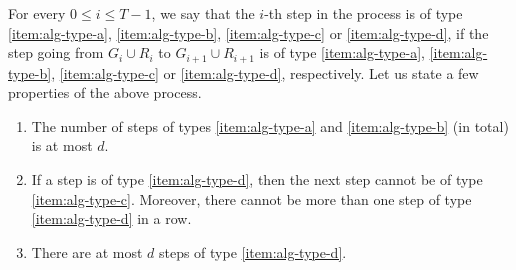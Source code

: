 \documentclass[11pt,a4paper,oneside,reqno]{amsart}
\newcommand{\1}{\mathbbm{1}} %
\renewcommand{\le}{\leqslant}
\begin{document}
For every $0 \le i \le T - 1$, we say that the $i$-th step in the process is of type \ref{item:alg-type-a}, \ref{item:alg-type-b}, \ref{item:alg-type-c} or \ref{item:alg-type-d}, if the step going from $G_i \cup R_i$ to $G_{i+1} \cup R_{i+1}$ is of type \ref{item:alg-type-a}, \ref{item:alg-type-b}, \ref{item:alg-type-c} or \ref{item:alg-type-d}, respectively. 
Let us state a few properties of the above process.

\begin{claim}\label{claim:alg-properties} 
    \begin{enumerate}
        \item The number of steps of types \ref{item:alg-type-a} and \ref{item:alg-type-b} (in total) is at most $d$.
        
        \item If a step is of type \ref{item:alg-type-d}, then the next step cannot be of type \ref{item:alg-type-c}. Moreover, there cannot be more than one step of type \ref{item:alg-type-d} in a row.
        
        \item There are at most $d$ steps of type \ref{item:alg-type-d}.
    \end{enumerate}
\end{claim}
\end{document}
